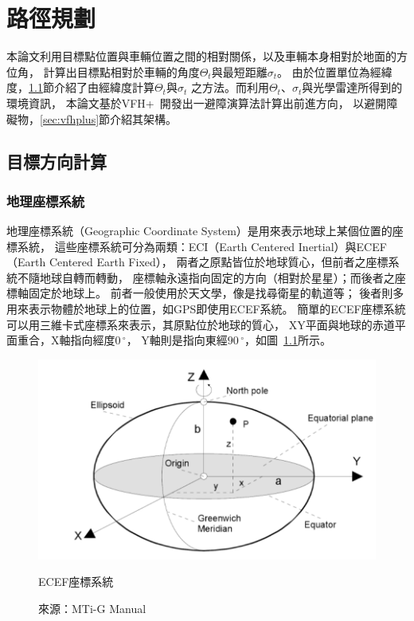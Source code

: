 \chapter{路徑規劃}
\label{c:algorithm}

本論文利用目標點位置與車輛位置之間的相對關係，以及車輛本身相對於地面的方位角，
計算出目標點相對於車輛的角度$\Theta_t$與最短距離$\sigma_t$。
由於位置單位為經緯度，\ref{sec:target}節介紹了由經緯度計算$\Theta_t$與$\sigma_t$
之方法。而利用$\Theta_t$、$\sigma_t$與光學雷達所得到的環境資訊，
本論文基於VFH+~\cite{Ulrich:1998:VFHPlus}開發出一避障演算法計算出前進方向，
以避開障礙物，\ref{sec:vfhplus}節介紹其架構。

\section{目標方向計算}
\label{sec:target}

\subsection{地理座標系統}
地理座標系統（Geographic Coordinate System）是用來表示地球上某個位置的座標系統，
這些座標系統可分為兩類：ECI（Earth Centered Inertial）與ECEF（Earth Centered Earth Fixed），
兩者之原點皆位於地球質心，但前者之座標系統不隨地球自轉而轉動，
座標軸永遠指向固定的方向（相對於星星）；而後者之座標軸固定於地球上。
前者一般使用於天文學，像是找尋衛星的軌道等；
後者則多用來表示物體於地球上的位置，如GPS即使用ECEF系統。
簡單的ECEF座標系統可以用三維卡式座標系來表示，其原點位於地球的質心，
XY平面與地球的赤道平面重合，X軸指向經度$0\,^{\circ}$，
Y軸則是指向東經$90\,^{\circ}$，如圖~\ref{f:ecef}所示。
\begin{figure}[h!]
	\centering
	\includegraphics[width=12cm]{figures/ECEF}
	\caption{ECEF座標系統}
	\caption*{來源：MTi-G Manual}
	\label{f:ecef}
\end{figure}

